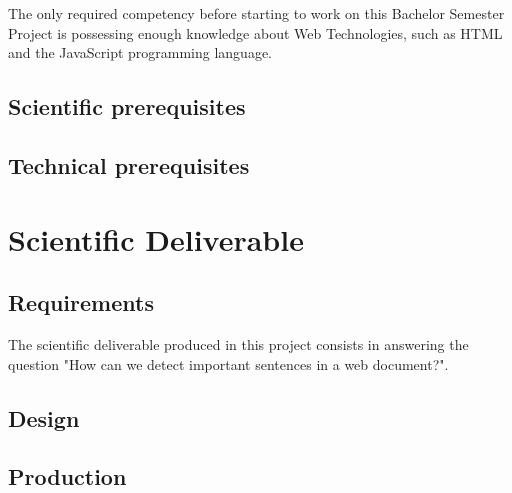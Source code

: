 \documentclass[conference,compsoc]{IEEEtran}
\begin{document}

The only required competency before starting to work on this Bachelor Semester Project is possessing enough knowledge about Web Technologies, such as HTML and the JavaScript programming language.

\subsection{Scientific prerequisites}


\lipsum[][1-3]

\subsection{Technical prerequisites}


\lipsum[][1-3]

\section{Scientific Deliverable}
\label{sec-sci-production}
\subsection{Requirements}

The scientific deliverable produced in this project consists in answering the question "How can we detect important sentences in a web document?".




\subsection{Design}


\subsection{Production}
\end{document}
